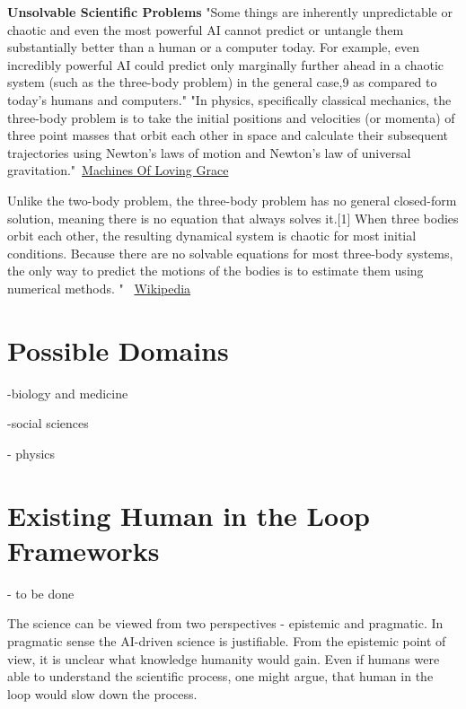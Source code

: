 \documentclass{article}
\begin{document}
\textbf{Unsolvable Scientific Problems} "Some things are inherently unpredictable or chaotic and even the most powerful AI cannot predict or untangle them substantially better than a human or a computer today. For example, even incredibly powerful AI could predict only marginally further ahead in a chaotic system (such as the three-body problem) in the general case,9 as compared to today’s humans and computers." "In physics, specifically classical mechanics, the three-body problem is to take the initial positions and velocities (or momenta) of three point masses that orbit each other in space and calculate their subsequent trajectories using Newton's laws of motion and Newton's law of universal gravitation."~\hyperlink{https://darioamodei.com/machines-of-loving-grace}{Machines Of Loving Grace}

Unlike the two-body problem, the three-body problem has no general closed-form solution, meaning there is no equation that always solves it.[1] When three bodies orbit each other, the resulting dynamical system is chaotic for most initial conditions. Because there are no solvable equations for most three-body systems, the only way to predict the motions of the bodies is to estimate them using numerical methods. " ~\hyperlink{https://en.wikipedia.org/wiki/Three-body_problem}{Wikipedia}


\section{Possible Domains}

-biology and medicine

-social sciences

- physics 

\section{Existing Human in the Loop Frameworks}

- to be done

The science can be viewed from two perspectives - epistemic and pragmatic. In pragmatic sense the AI-driven science is justifiable. From the epistemic point of view, it is unclear what knowledge humanity would gain. Even if humans were able to understand the scientific process, one might argue, that human in the loop would slow down the process.



\end{document}
